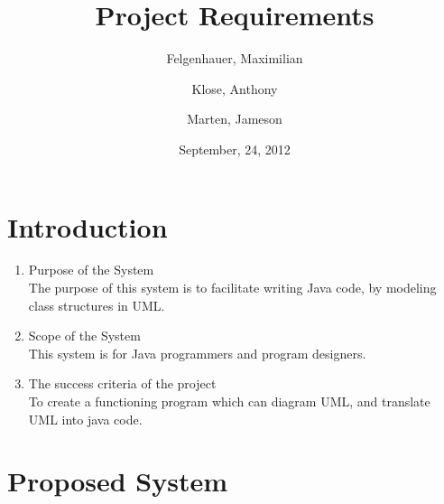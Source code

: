 \documentclass[a4paper, 12pt]{article}
\begin{document}
\title{Project Requirements}
\author{Felgenhauer, Maximilian\\
  \and
  Klose, Anthony\\
  \and
  Marten, Jameson}
\date{September, 24, 2012}

\maketitle

\section{Introduction}

\begin{enumerate}
\item{Purpose of the System}\\
  The purpose of this system is to facilitate writing Java code, by modeling class structures in UML.

\item{Scope of the System}\\
  This system is for Java programmers and program designers.

\item{The success criteria of the project}\\
  To create a functioning program which can diagram UML, and translate UML into java code.
\end{enumerate}

\section{Proposed System}
\end{document}
